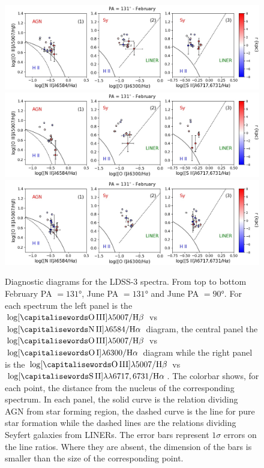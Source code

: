 \documentclass[../main.tex]{subfiles}
\begin{document}
\begin{figure}
\centering
\includegraphics[width=\textwidth]{images/paper3/PA131_2016_diagnostic.jpg}\\ 
\includegraphics[width=\textwidth]{images/paper3/PA131_diagnostic.jpg}\\ 
\includegraphics[width=\textwidth]{images/paper3/PA90_diagnostic.jpg}\\ 
\caption[]{Diagnostic diagrams for the LDSS-3 spectra. From top to bottom February PA $=\ang{131}$, June PA $=\ang{131}$ and June PA $=\ang{90}$. For each spectrum the left panel is the  $\log [\rm \ion{O}{III}]\lambda5007/\Hb$ vs $\log [\rm \ion{N}{II}]\lambda6584/\Ha$ diagram, the central panel the $\log [\rm \ion{O}{III}]\lambda5007/\Hb$ vs $\log [\rm \ion{O}{I}]\lambda6300/\Ha$ diagram while the right panel is the $\log [\rm \ion{O}{III}]\lambda5007/\Hb$ vs $\log [\rm \ion{S}{II}]\lambda\lambda6717,6731/\Ha$. The colorbar shows, for each point, the distance from the nucleus of the corresponding spectrum.
In each panel, the solid curve is the \citet{Kewley01} relation dividing AGN from star forming region, the dashed curve is the \citet{Kauffmann03} line for pure star formation while the dashed lines are the \citet{Kewley06} relations dividing Seyfert galaxies from LINERs.
The error bars represent $1\sigma$ errors on the line ratios. Where they are absent, the dimension of the bars is smaller than the size of the corresponding point. 
}
\label{fig:pap3_diagnostic}
\end{figure} 
\end{document}
